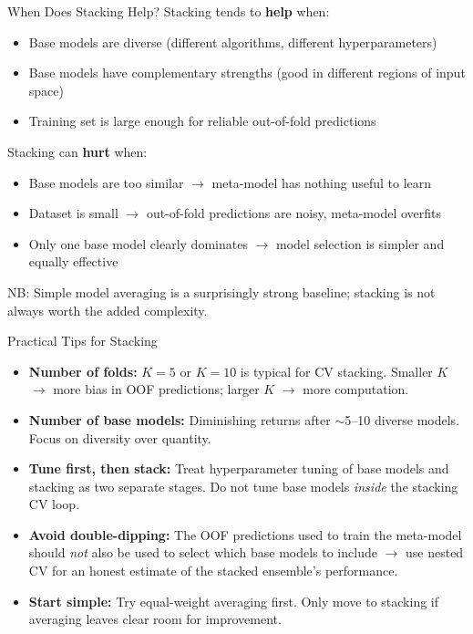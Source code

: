 \documentclass[11pt,compress,t,notes=noshow, xcolor=table]{beamer}
\begin{document}
\begin{vbframe}{When Does Stacking Help?}
\vfill
Stacking tends to \textbf{help} when:
\begin{itemize}
    \item Base models are diverse (different algorithms, different hyperparameters)
    \item Base models have complementary strengths (good in different regions of input space)
    \item Training set is large enough for reliable out-of-fold predictions
\end{itemize}
\vfill
Stacking can \textbf{hurt} when:
\begin{itemize}
    \item Base models are too similar $\rightarrow$ meta-model has nothing useful to learn
    \item Dataset is small $\rightarrow$ out-of-fold predictions are noisy, meta-model overfits
    \item Only one base model clearly dominates $\rightarrow$ model selection is simpler and equally effective
\end{itemize}
\vfill
NB: Simple model averaging is a surprisingly strong baseline; stacking is not always worth the added complexity.
\vfill
\end{vbframe}


\begin{vbframe}{Practical Tips for Stacking}
\vfill
\begin{itemize}
    \item \textbf{Number of folds:} $K = 5$ or $K = 10$ is typical for CV stacking. Smaller $K$ $\rightarrow$ more bias in OOF predictions; larger $K$ $\rightarrow$ more computation.
    \item \textbf{Number of base models:} Diminishing returns after $\sim$5--10 diverse models. Focus on diversity over quantity.
    \item \textbf{Tune first, then stack:} Treat hyperparameter tuning of base models and stacking as two separate stages. Do not tune base models \emph{inside} the stacking CV loop.
    \item \textbf{Avoid double-dipping:} The OOF predictions used to train the meta-model should \emph{not} also be used to select which base models to include $\rightarrow$ use nested CV for an honest estimate of the stacked ensemble's performance.
    \item \textbf{Start simple:} Try equal-weight averaging first. Only move to stacking if averaging leaves clear room for improvement.
\end{itemize}
\vfill
\end{vbframe}
\end{document}
